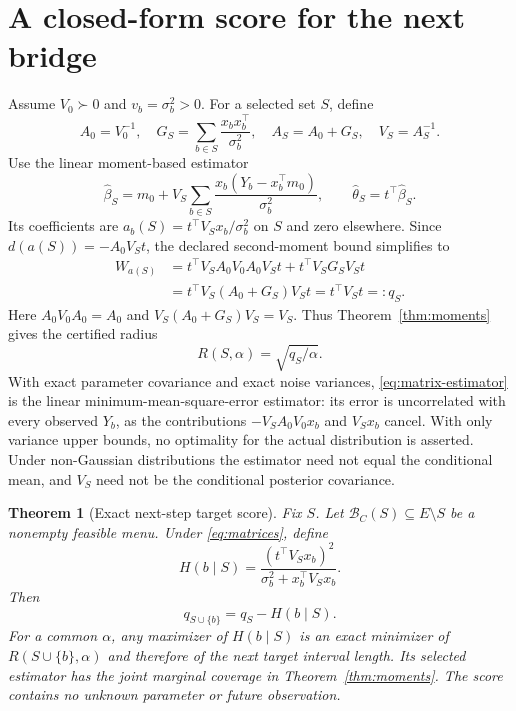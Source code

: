 \documentclass[11pt]{article}
\newtheorem{theorem}{Theorem}
\theoremstyle{remark}
\begin{document}
\section{A closed-form score for the next bridge}
\label{sec:score}
Assume $V_0\succ0$ and $v_b=\sigma_b^2>0$. For a selected set $S$, define
\begin{equation}
 A_0=V_0^{-1},\quad
 G_S=\sum_{b\in S}\frac{x_bx_b^\top}{\sigma_b^2},\quad
 A_S=A_0+G_S,\quad V_S=A_S^{-1}.                              \label{eq:matrices}
\end{equation}
Use the linear moment-based estimator
\begin{equation}
 \widehat\beta_S=m_0+V_S\sum_{b\in S}
       \frac{x_b(Y_b-x_b^\top m_0)}{\sigma_b^2},
 \qquad \widehat\theta_S=t^\top\widehat\beta_S.                 \label{eq:matrix-estimator}
\end{equation}
Its coefficients are $a_b(S)=t^\top V_Sx_b/\sigma_b^2$ on $S$ and zero elsewhere. Since $d(a(S))=-A_0V_St$, the declared second-moment bound simplifies to
\begin{align}
 W_{a(S)}
 &=t^\top V_SA_0V_0A_0V_St+t^\top V_SG_SV_St\nonumber\\
 &=t^\top V_S(A_0+G_S)V_St=t^\top V_St=:q_S.                  \label{eq:Wq}
\end{align}
Here $A_0V_0A_0=A_0$ and $V_S(A_0+G_S)V_S=V_S$. Thus Theorem~\ref{thm:moments} gives the certified radius
\begin{equation}
 R(S,\alpha)=\sqrt{q_S/\alpha}.                               \label{eq:matrix-radius}
\end{equation}
With exact parameter covariance and exact noise variances, \eqref{eq:matrix-estimator} is the linear minimum-mean-square-error estimator: its error is uncorrelated with every observed $Y_b$, as the contributions $-V_SA_0V_0x_b$ and $V_Sx_b$ cancel. With only variance upper bounds, no optimality for the actual distribution is asserted. Under non-Gaussian distributions the estimator need not equal the conditional mean, and $V_S$ need not be the conditional posterior covariance.

\begin{theorem}[Exact next-step target score]\label{thm:target-score}
Fix $S$. Let $\mathcal B_C(S)\subseteq E\setminus S$ be a nonempty feasible menu. Under \eqref{eq:matrices}, define
\begin{equation}
 H(b\mid S)=\frac{(t^\top V_Sx_b)^2}
                  {\sigma_b^2+x_b^\top V_Sx_b}.                \label{eq:target-score}
\end{equation}
Then
\begin{equation}
 q_{S\cup\{b\}}=q_S-H(b\mid S).                               \label{eq:q-update}
\end{equation}
For a common $\alpha$, any maximizer of $H(b\mid S)$ is an exact minimizer of $R(S\cup\{b\},\alpha)$ and therefore of the next target interval length. Its selected estimator has the joint marginal coverage in Theorem~\ref{thm:moments}. The score contains no unknown parameter or future observation.
\end{theorem}
\end{document}
